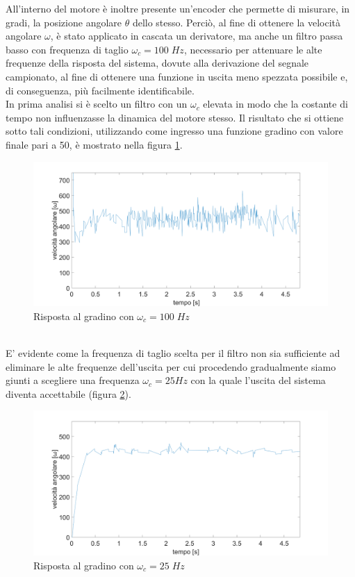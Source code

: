 All'interno del motore è inoltre presente un'encoder che permette di misurare, in gradi, la posizione angolare $\theta$ dello stesso.
Perciò, al fine di ottenere la velocità angolare $\omega$, è stato applicato in cascata un derivatore, ma anche un filtro passa basso con frequenza di taglio $\omega_c=100\;Hz$, necessario per attenuare le alte frequenze della risposta del sistema, dovute alla derivazione del segnale campionato, al fine di ottenere una funzione in uscita meno spezzata possibile e, di conseguenza, più facilmente identificabile.\\
In prima analisi si è scelto un filtro con un $\omega_c$ elevata in modo che la costante di tempo non influenzasse la dinamica del motore stesso.
Il risultato che si ottiene sotto tali condizioni, utilizzando come ingresso una funzione gradino con valore finale pari a 50, è mostrato nella figura \ref{motore50StepCamp1000Polo100}.
\begin{figure}[ht]
	\centering
	\includegraphics[width=\textwidth]{motore50StepCamp1000Polo100.png}
	\caption{Risposta al gradino con $\omega_c=100\;Hz$ }
	\label{motore50StepCamp1000Polo100}
\end{figure}
\\E' evidente come la frequenza di taglio scelta per il filtro non sia sufficiente ad eliminare le alte frequenze dell'uscita per cui procedendo gradualmente siamo giunti a  scegliere una frequenza $\omega_c = 25Hz$ con la quale l'uscita del sistema diventa accettabile (figura \ref{motore50StepCamp1000}).
\begin{figure}[ht]
\centering
\includegraphics[width=\textwidth]{motore50StepCamp1000.png}
\caption{Risposta al gradino con $\omega_c=25\;Hz$}
\label{motore50StepCamp1000}
\end{figure}
